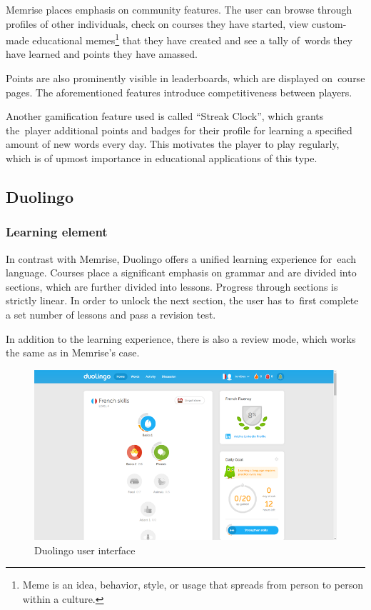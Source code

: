 \documentclass[thesis=B,english,hidelinks]{FITthesisXE}[2012/06/26]
\begin{document}
Memrise places emphasis on community features. The user can browse through profiles of other individuals, check on courses they have started, view custom-made educational memes\footnote{Meme is an idea, behavior, style, or usage that spreads from person to person within a culture.\autocite{merriammeme}} that they have created and see a tally of~words they have learned and points they have amassed.

Points are also prominently visible in leaderboards, which are displayed on~course pages. The aforementioned features introduce competitiveness between players.

Another gamification feature used is called ``Streak Clock'', which grants the~player additional points and badges for their profile for learning a specified amount of new words every day. This motivates the player to play regularly, which is of upmost importance in educational applications of this type.

\subsection{Duolingo}

\subsubsection{Learning element}

In contrast with Memrise, Duolingo offers a unified learning experience for~each language. Courses place a significant emphasis on grammar and are divided into sections, which are further divided into lessons. Progress through sections is strictly linear. In order to unlock the next section, the user has to~first complete a set number of lessons and pass a revision test.

In addition to the learning experience, there is also a review mode, which works the same as in Memrise's case.

\begin{figure}[ht]
\centering
\includegraphics[scale=0.45]{duolingo}
\caption{Duolingo user interface}
\label{fig:duolingo}
\end{figure}
\end{document}
